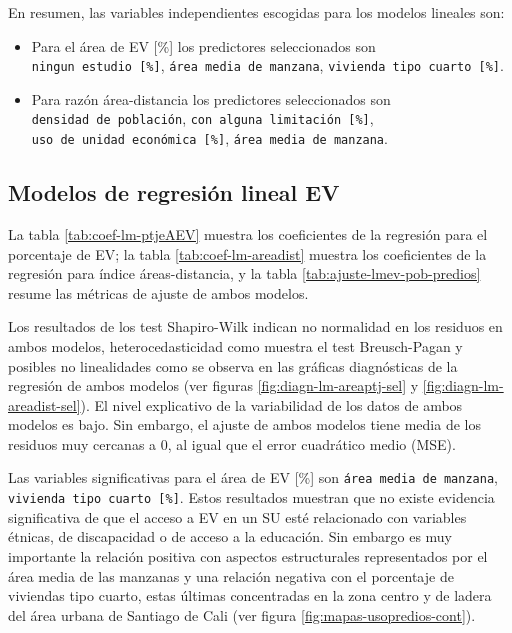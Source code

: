 \documentclass[12pt,a4paper,oneside, openany]{book}
\theoremstyle{definition}
\theoremstyle{definition}
\theoremstyle{definition}
\theoremstyle{remark}
\begin{document}
En resumen, las variables independientes escogidas para los modelos
lineales son:

\begin{itemize}
\item
  Para el área de EV {[}\%{]} los predictores seleccionados son
  \texttt{ningun\ estudio\ {[}\%{]}}, \texttt{área\ media\ de\ manzana},
  \texttt{vivienda\ tipo\ cuarto\ {[}\%{]}}.
\item
  Para razón área-distancia los predictores seleccionados son
  \texttt{densidad\ de\ población},
  \texttt{con\ alguna\ limitación\ {[}\%{]}},
  \texttt{uso\ de\ unidad\ económica\ {[}\%{]}},
  \texttt{área\ media\ de\ manzana}.
\end{itemize}

\subsection{Modelos de regresión lineal
EV}\label{modelos-de-regresiuxf3n-lineal-ev}

La tabla \ref{tab:coef-lm-ptjeAEV} muestra los coeficientes de la
regresión para el porcentaje de EV; la tabla \ref{tab:coef-lm-areadist}
muestra los coeficientes de la regresión para índice áreas-distancia, y
la tabla \ref{tab:ajuste-lmev-pob-predios} resume las métricas de ajuste
de ambos modelos.

Los resultados de los test Shapiro-Wilk indican no normalidad en los
residuos en ambos modelos, heterocedasticidad como muestra el test
Breusch-Pagan y posibles no linealidades como se observa en las gráficas
diagnósticas de la regresión de ambos modelos (ver figuras
\ref{fig:diagn-lm-areaptj-sel} y \ref{fig:diagn-lm-areadist-sel}). El
nivel explicativo de la variabilidad de los datos de ambos modelos es
bajo. Sin embargo, el ajuste de ambos modelos tiene media de los
residuos muy cercanas a 0, al igual que el error cuadrático medio (MSE).

Las variables significativas para el área de EV {[}\%{]} son
\texttt{área\ media\ de\ manzana},
\texttt{vivienda\ tipo\ cuarto\ {[}\%{]}}. Estos resultados muestran que
no existe evidencia significativa de que el acceso a EV en un SU esté
relacionado con variables étnicas, de discapacidad o de acceso a la
educación. Sin embargo es muy importante la relación positiva con
aspectos estructurales representados por el área media de las manzanas y
una relación negativa con el porcentaje de viviendas tipo cuarto, estas
últimas concentradas en la zona centro y de ladera del área urbana de
Santiago de Cali (ver figura \ref{fig:mapas-usopredios-cont}).
\end{document}
